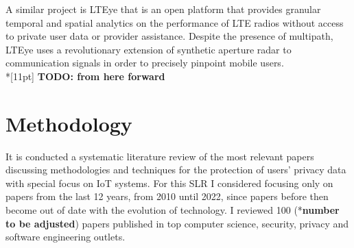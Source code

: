 \documentclass[conference]{IEEEtran}
\begin{document}
A similar project is LTEye \cite{KumarLTE} that is an open
platform that provides granular temporal and spatial analytics on the performance of LTE
radios without access to private user data or provider assistance. Despite the presence of
multipath, LTEye uses a revolutionary extension of synthetic aperture radar to communication
signals in order to precisely pinpoint mobile users.
\\*[11pt]
\textbf{TODO: from here forward}


\section{Methodology}

It is conducted a systematic literature review of the most relevant papers
discussing methodologies and techniques for the protection of users' privacy data
with special focus on IoT systems. For this SLR I considered focusing only
on papers from the last 12 years, from 2010 until 2022, since papers before then
become out of date with the evolution of technology. I reviewed 100 (*\textbf{\color{red}number to be adjusted}) papers published
in top computer science, security, privacy and software engineering outlets.
\end{document}
